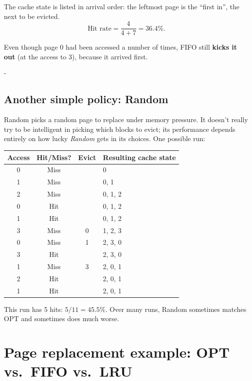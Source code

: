 \documentclass[11pt,a4paper]{article}
\makeatletter
\newcommand{\keepspace}[1]{\par\penalty-100\begingroup
  \setlength{\dimen@}{#1}\dimen@ii\pagegoal\advance\dimen@ii-\pagetotal
  \ifdim\dimen@>\dimen@ii\ifdim\dimen@ii>\z@\vfil\fi\break\fi\endgroup}
\makeatother
\begin{document}
The cache state is listed in arrival order: the leftmost page is the
``first in'', the next to be evicted.
\[
  \text{Hit rate} = \frac{4}{4+7} = 36.4\%.
\]
\begin{warnbox}
Even though page 0 had been accessed a number of times, FIFO still
\textbf{kicks it out} (at the access to 3), because it arrived first.
\end{warnbox}

\keepspace{24\baselineskip}
\subsection{Another simple policy: Random}

Random picks a random page to replace under memory pressure. It doesn't
really try to be intelligent in picking which blocks to evict; its
performance depends entirely on how lucky \emph{Random} gets in its
choices. One possible run:

\begin{center}
\renewcommand{\arraystretch}{1.08}
\begin{tabular}{@{}cccl@{}}
  \toprule
  \textbf{Access} & \textbf{Hit/Miss?} & \textbf{Evict} & \textbf{Resulting cache state} \\
  \midrule
  0 & Miss &   & 0 \\
  1 & Miss &   & 0, 1 \\
  2 & Miss &   & 0, 1, 2 \\
  0 & Hit  &   & 0, 1, 2 \\
  1 & Hit  &   & 0, 1, 2 \\
  3 & Miss & 0 & 1, 2, 3 \\
  0 & Miss & 1 & 2, 3, 0 \\
  3 & Hit  &   & 2, 3, 0 \\
  1 & Miss & 3 & 2, 0, 1 \\
  2 & Hit  &   & 2, 0, 1 \\
  1 & Hit  &   & 2, 0, 1 \\
  \bottomrule
\end{tabular}
\end{center}

This run has 5 hits: \(5/11 = 45.5\%\). Over many runs, Random sometimes
matches OPT and sometimes does much worse.

\section{Page replacement example: OPT vs.\ FIFO vs.\ LRU}
\end{document}
